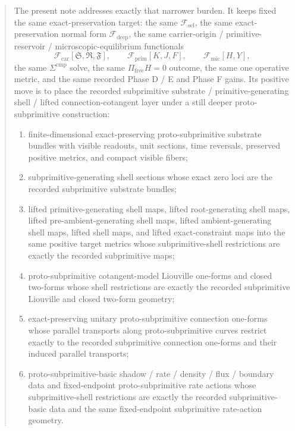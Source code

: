\documentclass[11pt]{article}
\newcommand{\GaugeAux}{Y}
\newcommand{\MicFunctional}{\mathscr F_{\mathrm{mic}}}
\newcommand{\PrimFunctional}{\mathscr F_{\mathrm{prim}}}
\newcommand{\CarrierFunctional}{\mathscr F_{\mathrm{car}}}
\newcommand{\DeepFunctional}{\mathscr F_{\mathrm{deep}}}
\newcommand{\StemFunctional}{\mathscr F_{\mathrm{sel}}}
\newcommand{\PrimStrain}{K}
\newcommand{\PrimNeutral}{J}
\newcommand{\PrimFree}{F}
\newcommand{\CarrierSeed}{\mathfrak S}
\newcommand{\RelabelSeed}{\mathfrak R}
\newcommand{\FreeSeed}{\mathfrak F}
\begin{document}
\begin{abstract}
The present note addresses exactly that narrower burden. It keeps fixed the same exact-preservation target: the same \(\StemFunctional\), the same exact-preservation normal form \(\DeepFunctional\), the same carrier-origin / primitive-reservoir / microscopic-equilibrium functionals
\[
\CarrierFunctional[\CarrierSeed,\RelabelSeed,\FreeSeed],\qquad
\PrimFunctional[\PrimStrain,\PrimNeutral,\PrimFree],\qquad
\MicFunctional[H,\GaugeAux],
\]
the same \(\Sigma^{\mathrm{cmp}}\) solve, the same \(\Pi_{\mathrm{free}}H=0\) outcome, the same one operative metric, and the same recorded Phase D / E and Phase F gains. Its positive move is to place the recorded subprimitive substrate / primitive-generating shell / lifted connection-cotangent layer under a still deeper proto-subprimitive construction:
\begin{enumerate}
    \item finite-dimensional exact-preserving proto-subprimitive substrate bundles with visible readouts, unit sections, time reversals, preserved positive metrics, and compact visible fibers;
    \item subprimitive-generating shell sections whose exact zero loci are the recorded subprimitive substrate bundles;
    \item lifted primitive-generating shell maps, lifted root-generating shell maps, lifted pre-ambient-generating shell maps, lifted ambient-generating shell maps, lifted shell maps, and lifted exact-constraint maps into the same positive target metrics whose subprimitive-shell restrictions are exactly the recorded subprimitive maps;
    \item proto-subprimitive cotangent-model Liouville one-forms and closed two-forms whose shell restrictions are exactly the recorded subprimitive Liouville and closed two-form geometry;
    \item exact-preserving unitary proto-subprimitive connection one-forms whose parallel transports along proto-subprimitive curves restrict exactly to the recorded subprimitive connection one-forms and their induced parallel transports;
    \item proto-subprimitive-basic shadow / rate / density / flux / boundary data and fixed-endpoint proto-subprimitive rate actions whose subprimitive-shell restrictions are exactly the recorded subprimitive-basic data and the same fixed-endpoint subprimitive rate-action geometry.
\end{enumerate}


\end{abstract}
\end{document}
